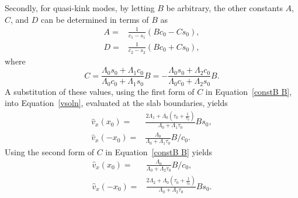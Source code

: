 Secondly, for quasi-kink modes, by letting $B$ be arbitrary, the other constants $A$, $C$, and $D$ can be determined in terms of $B$ as
\begin{align}
A =& \frac{1}{c_1 - s_1}(Bc_0 - Cs_0), \label{constA B} \\ 
D =& \frac{1}{c_2 - s_2}(Bc_0 + Cs_0), \label{constD B}
\end{align}
where
\begin{equation}
C = \frac{\Lambda_0s_0 + \Lambda_1c_0}{\Lambda_0c_0 + \Lambda_1s_0}B = -\frac{\Lambda_0s_0 + \Lambda_2c_0}{\Lambda_0c_0 + \Lambda_2s_0}B. \label{constB B}
\end{equation}
A substitution of these values, using the first form of $C$ in Equation~\eqref{constB B}, into Equation~\eqref{vsoln}, evaluated at the slab boundaries, yields
\begin{align}
\hat{v}_x(x_0) =& \frac{2\Lambda_1 + \Lambda_0\left(\tau_0 + \frac{1}{\tau_0}\right)}{\Lambda_0 + \Lambda_1\tau_0}Bs_0, \label{vx_01 B} \\
\hat{v}_x(-x_0) =& \frac{\Lambda_0}{\Lambda_0 + \Lambda_1\tau_0}B/c_0. \label{v-x_01 B}
\end{align}
Using the second form of $C$ in Equation~\eqref{constB B} yields
\begin{align}
\hat{v}_x(x_0) =& \frac{\Lambda_0}{\Lambda_0 + \Lambda_2\tau_0}B/c_0, \label{vx_02 B} \\
\hat{v}_x(-x_0) =& \frac{2\Lambda_2 + \Lambda_0\left(\tau_0 + \frac{1}{\tau_0}\right)}{\Lambda_0 + \Lambda_2\tau_0}Bs_0. \label{v-x_02 B}
\end{align}

